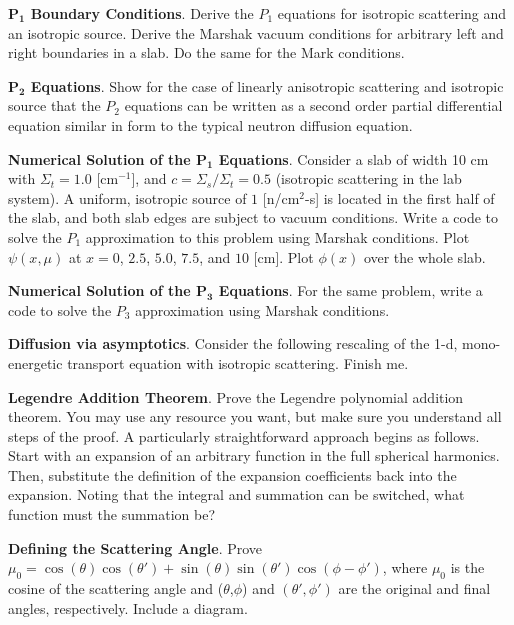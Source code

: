\begin{exercises}

  \item  \textbf{P$_{\mathbf{1}}$ Boundary Conditions}. Derive the $P_1$ equations for isotropic scattering and an isotropic source.  Derive the Marshak vacuum conditions for arbitrary left and right boundaries in a slab.  Do the same for the Mark conditions. 

  \item \textbf{P$_{\mathbf{2}}$ Equations}. Show for the case of linearly anisotropic scattering and isotropic source that the $P_2$ equations can be written as a second order partial differential equation similar in form to the typical neutron diffusion equation.

  \item \textbf{Numerical Solution of the P$_{\mathbf{1}}$ Equations}. Consider a slab of width 10 cm with $\Sigma_t = 1.0$ [cm$^{-1}$], and $c = \Sigma_s / \Sigma_t = 0.5$ (isotropic scattering in the lab system).  A uniform, isotropic source of $1$ [n/cm$^2$-s] is located in the first half of the slab, and both slab edges are subject to vacuum conditions. Write a code to solve the $P_1$ approximation to this problem using Marshak conditions.  Plot $\psi(x,\mu)$ at $x = 0$, $2.5$, $5.0$, $7.5$, and $10$ [cm].  Plot $\phi(x)$ over the whole slab.

  \item \textbf{Numerical Solution of the P$_{\mathbf{3}}$ Equations}. For the same problem, write a code to solve the $P_3$ approximation using Marshak conditions.

  \item \textbf{ Diffusion via asymptotics}.  Consider the following rescaling of the 1-d, mono-energetic transport equation with isotropic scattering. Finish me.

  \item \textbf{Legendre Addition Theorem}. Prove the Legendre polynomial addition theorem.  You may use any resource you want, but make sure you understand all steps of the proof.  A particularly straightforward approach begins as follows.  Start with an expansion of an arbitrary function in the full spherical harmonics.  Then, substitute the definition of the expansion coefficients back into the expansion.  Noting that the integral and summation can be switched, what function must the summation be?  

  \item \textbf{Defining the Scattering Angle}. Prove $\mu_0 = \cos(\theta)\cos(\theta')+\sin(\theta)\sin(\theta')\cos(\phi-\phi')$, where $\mu_0$ is the cosine of the scattering angle and ($\theta$,$\phi$) and $(\theta',\phi')$ are the original and final angles, respectively.  Include a diagram.

\end{exercises}
